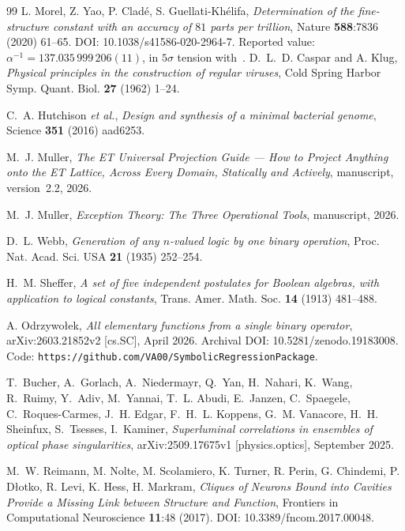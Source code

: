 \documentclass[11pt,a4paper]{article}
\theoremstyle{definition}
\theoremstyle{remark}
\begin{document}
\begin{thebibliography}{99}
L. Morel, Z. Yao, P. Clad\'e, S. Guellati-Kh\'elifa,
\emph{Determination of the fine-structure constant with an accuracy of $81$ parts per trillion},
Nature {\bf 588}:7836 (2020) 61--65.
DOI: 10.1038/s41586-020-2964-7.
Reported value: $\alpha^{-1} = 137.035\,999\,206(11)$, in $5\sigma$ tension with~\cite{Parker2018}.
D.~L.~D. Caspar and A. Klug,
\emph{Physical principles in the construction of regular viruses},
Cold Spring Harbor Symp. Quant. Biol. {\bf 27} (1962) 1--24.

C.~A. Hutchison \emph{et al.},
\emph{Design and synthesis of a minimal bacterial genome},
Science {\bf 351} (2016) aad6253.

M.~J. Muller,
\emph{The ET Universal Projection Guide --- How to Project Anything onto the ET Lattice, Across Every Domain, Statically and Actively}, manuscript, version~2.2, 2026.

M.~J. Muller,
\emph{Exception Theory: The Three Operational Tools}, manuscript, 2026.

D.~L. Webb,
\emph{Generation of any $n$-valued logic by one binary operation},
Proc. Nat. Acad. Sci. USA {\bf 21} (1935) 252--254.

H.~M. Sheffer,
\emph{A set of five independent postulates for Boolean algebras, with application to logical constants},
Trans. Amer. Math. Soc. {\bf 14} (1913) 481--488.

A. Odrzywo{\l}ek,
\emph{All elementary functions from a single binary operator},
arXiv:2603.21852v2 [cs.SC], April 2026.
Archival DOI: 10.5281/zenodo.19183008.
Code: \texttt{https://github.com/VA00/SymbolicRegressionPackage}.

T.~Bucher, A.~Gorlach, A.~Niedermayr, Q.~Yan, H.~Nahari, K.~Wang, R.~Ruimy,
Y.~Adiv, M.~Yannai, T.~L. Abudi, E.~Janzen, C.~Spaegele, C.~Roques-Carmes,
J.~H. Edgar, F.~H.~L. Koppens, G.~M. Vanacore, H.~H. Sheinfux, S.~Tsesses, I.~Kaminer,
\emph{Superluminal correlations in ensembles of optical phase singularities},
arXiv:2509.17675v1 [physics.optics], September 2025.

M.~W. Reimann, M. Nolte, M. Scolamiero, K. Turner, R. Perin, G. Chindemi, P. D{\l}otko, R. Levi, K. Hess, H. Markram,
\emph{Cliques of Neurons Bound into Cavities Provide a Missing Link between Structure and Function},
Frontiers in Computational Neuroscience {\bf 11}:48 (2017).
DOI: 10.3389/fncom.2017.00048.


\end{thebibliography}
\end{document}
